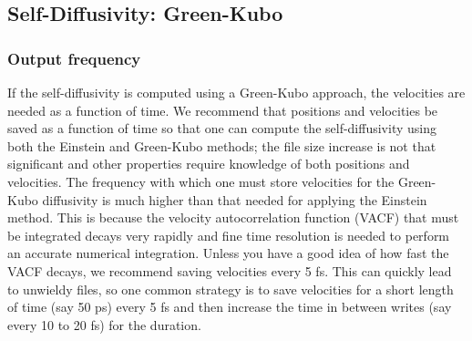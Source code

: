 \documentclass[9pt,bestpractices]{livecoms}
\begin{document}

\subsection{Self-Diffusivity: Green-Kubo} \label{sec:Self-Diffusivity Green-Kubo}


\subsubsection{Output frequency} \label{sec:Self-Diffusivity:Green-Kubo: Output frequency}

If the self-diffusivity is computed using a Green-Kubo approach, the velocities are needed as a function of time. We recommend that positions and velocities be saved as a function of time so that one can compute the self-diffusivity using both the Einstein and Green-Kubo methods; the file size increase is not that significant and other properties require knowledge of both positions and velocities. The frequency with which one must store velocities for the Green-Kubo diffusivity is much higher than that needed for applying the Einstein method. This is because the velocity autocorrelation function (VACF) that must be integrated decays very rapidly and fine time resolution is needed to perform an accurate numerical integration. Unless you have a good idea of how fast the VACF decays, we recommend saving velocities every 5 fs. This can quickly lead to unwieldy files, so one common strategy is to save velocities for a short length of time (say 50 ps) every 5 fs and then increase the time in between writes (say every 10 to 20 fs) for the duration.
\end{document}
